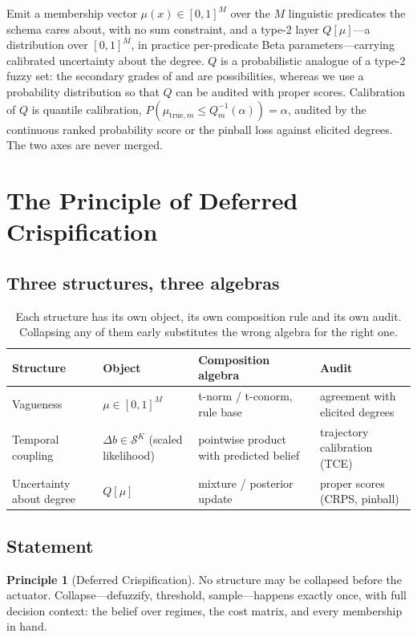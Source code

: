 \documentclass[11pt,a4paper]{article}
\numberwithin{equation}{section}
\theoremstyle{plain}
\theoremstyle{definition}
\newtheorem{principle}{Principle}
\theoremstyle{remark}
\newcommand{\simplex}{\mathcal{S}}
\begin{document}
Emit a membership vector $\mu(x)\in[0,1]^M$ over the $M$ linguistic predicates the schema cares about, with no sum constraint, and a type-2 layer $Q[\mu]$---a distribution over $[0,1]^M$, in practice per-predicate Beta parameters---carrying calibrated uncertainty about the degree. $Q$ is a probabilistic analogue of a type-2 fuzzy set: the secondary grades of \citet{zadeh1975} and \citet{mendel2007} are possibilities, whereas we use a probability distribution so that $Q$ can be audited with proper scores. Calibration of $Q$ is quantile calibration, $P(\mu_{\mathrm{true},m}\le Q_m^{-1}(\alpha))=\alpha$, audited by the continuous ranked probability score or the pinball loss against elicited degrees. The two axes are never merged.

\section{The Principle of Deferred Crispification}\label{sec:principle}

\subsection{Three structures, three algebras}

\begin{table}[h]
\centering\small
\begin{tabularx}{\textwidth}{@{}lXXX@{}}
\toprule
Structure & Object & Composition algebra & Audit\\
\midrule
Vagueness & $\mu\in[0,1]^M$ & t-norm / t-conorm, rule base & agreement with elicited degrees\\
Temporal coupling & $\Delta b\in\simplex^K$ (scaled likelihood) & pointwise product with predicted belief & trajectory calibration (TCE)\\
Uncertainty about degree & $Q[\mu]$ & mixture / posterior update & proper scores (CRPS, pinball)\\
\bottomrule
\end{tabularx}
\caption{Each structure has its own object, its own composition rule and its own audit. Collapsing any of them early substitutes the wrong algebra for the right one.}
\end{table}

\subsection{Statement}

\begin{principle}[Deferred Crispification]
No structure may be collapsed before the actuator. Collapse---defuzzify, threshold, sample---happens exactly once, with full decision context: the belief over regimes, the cost matrix, and every membership in hand.
\end{principle}
\end{document}
